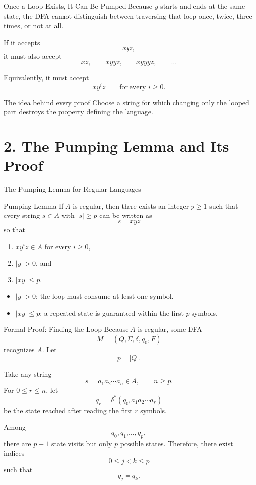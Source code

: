 \documentclass[10pt,aspectratio=169]{beamer}
\begin{document}
\begin{frame}{Once a Loop Exists, It Can Be Pumped}
Because $y$ starts and ends at the same state, the DFA cannot distinguish
between traversing that loop once, twice, three times, or not at all.

If it accepts
\[
xyz,
\]
it must also accept
\[
xz,\qquad xyyz,\qquad xyyyz,\qquad\ldots
\]

Equivalently, it must accept
\[
xy^iz
\qquad\text{for every }i\geq 0.
\]

\begin{block}{The idea behind every proof}
Choose a string for which changing only the looped part destroys the
property defining the language.
\end{block}
\end{frame}

\section{2. The Pumping Lemma and Its Proof}

\begin{frame}{The Pumping Lemma for Regular Languages}
\begin{block}{Pumping Lemma}
If $A$ is regular, then there exists an integer $p\geq 1$ such that every
string $s\in A$ with $|s|\geq p$ can be written as
\[
s=xyz
\]
so that
\begin{enumerate}
    \item $xy^iz\in A$ for every $i\geq 0$,
    \item $|y|>0$, and
    \item $|xy|\leq p$.
\end{enumerate}
\end{block}

\begin{itemize}
    \item $|y|>0$: the loop must consume at least one symbol.
    \item $|xy|\leq p$: a repeated state is guaranteed within the first
          $p$ symbols.
\end{itemize}
\end{frame}

\begin{frame}{Formal Proof: Finding the Loop}
\footnotesize
Because $A$ is regular, some DFA
\[
M=(Q,\Sigma,\delta,q_0,F)
\]
recognizes $A$. Let
\[
p=|Q|.
\]

Take any string
\[
s=a_1a_2\cdots a_n\in A,
\qquad n\geq p.
\]
For $0\leq r\leq n$, let
\[
q_r=\delta^*(q_0,a_1a_2\cdots a_r)
\]
be the state reached after reading the first $r$ symbols.

Among
\[
q_0,q_1,\ldots,q_p,
\]
there are $p+1$ state visits but only $p$ possible states. Therefore,
there exist indices
\[
0\leq j<k\leq p
\]
such that
\[
q_j=q_k.
\]
\end{frame}
\end{document}
